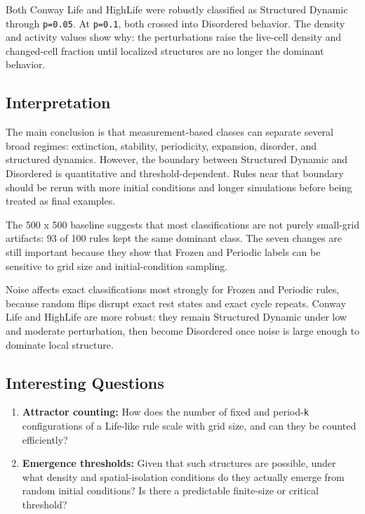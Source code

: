 \documentclass[
]{article}
\begin{document}
Both Conway Life and HighLife were robustly classified as Structured
Dynamic through \texttt{p=0.05}. At \texttt{p=0.1}, both crossed into
Disordered behavior. The density and activity values show why: the
perturbations raise the live-cell density and changed-cell fraction
until localized structures are no longer the dominant behavior.

\subsection{Interpretation}\label{interpretation}

The main conclusion is that measurement-based classes can separate
several broad regimes: extinction, stability, periodicity, expansion,
disorder, and structured dynamics. However, the boundary between
Structured Dynamic and Disordered is quantitative and
threshold-dependent. Rules near that boundary should be rerun with more
initial conditions and longer simulations before being treated as final
examples.

The 500 x 500 baseline suggests that most classifications are not purely
small-grid artifacts: 93 of 100 rules kept the same dominant class. The
seven changes are still important because they show that Frozen and
Periodic labels can be sensitive to grid size and initial-condition
sampling.

Noise affects exact classifications most strongly for Frozen and
Periodic rules, because random flips disrupt exact rest states and exact
cycle repeats. Conway Life and HighLife are more robust: they remain
Structured Dynamic under low and moderate perturbation, then become
Disordered once noise is large enough to dominate local structure.

\subsection{Interesting Questions}\label{interesting-questions}

\begin{enumerate}
\def\labelenumi{\arabic{enumi}.}
\item
  \textbf{Attractor counting:} How does the number of fixed and
  period-\texttt{k} configurations of a Life-like rule scale with grid
  size, and can they be counted efficiently?
\item
  \textbf{Emergence thresholds:} Given that such structures are
  possible, under what density and spatial-isolation conditions do they
  actually emerge from random initial conditions? Is there a predictable
  finite-size or critical threshold?
\end{enumerate}
\end{document}
